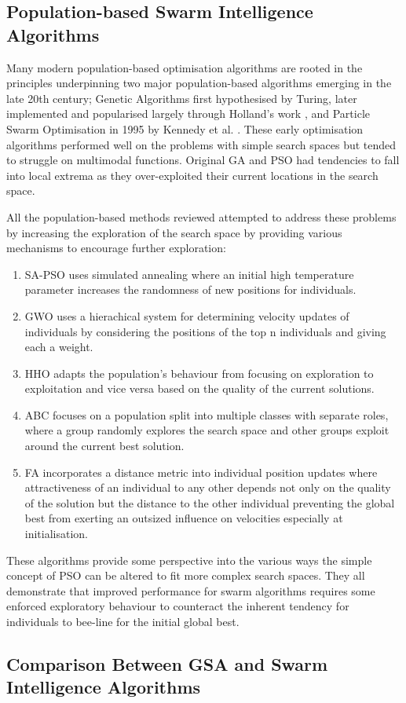 \documentclass[a4paper, 12pt]{extarticle}
\begin{document}
\subsection{Population-based Swarm Intelligence Algorithms}
Many modern population-based optimisation algorithms are rooted in the principles underpinning two major population-based algorithms emerging in the late 20th century; Genetic Algorithms first hypothesised by Turing, later implemented and popularised largely through Holland's work \cite{holland1992genetic}, and Particle Swarm Optimisation in 1995 by Kennedy et al. \cite{kennedy1995particle}. These early optimisation algorithms performed well on the problems with simple search spaces but tended to struggle on multimodal functions. Original GA and PSO had tendencies to fall into local extrema as they over-exploited their current locations in the search space.

All the population-based methods reviewed attempted to address these problems by increasing the exploration of the search space by providing various mechanisms to encourage further exploration:
\begin{enumerate}
    \item SA-PSO uses simulated annealing where an initial high temperature parameter increases the randomness of new positions for individuals.
    \item GWO uses a hierachical system for determining velocity updates of individuals by considering the positions of the top n individuals and giving each a weight.
    \item HHO adapts the population's behaviour from focusing on exploration to exploitation and vice versa based on the quality of the current solutions.
    \item ABC focuses on a population split into multiple classes with separate roles, where a group randomly explores the search space and other groups exploit around the current best solution.
    \item FA incorporates a distance metric into individual position updates where attractiveness of an individual to any other depends not only on the quality of the solution but the distance to the other individual preventing the global best from exerting an outsized influence on velocities especially at initialisation.
\end{enumerate}

These algorithms provide some perspective into the various ways the simple concept of PSO can be altered to fit more complex search spaces. They all demonstrate that improved performance for swarm algorithms requires some enforced exploratory behaviour to counteract the inherent tendency for individuals to bee-line for the initial global best. 


\subsection{Comparison Between GSA and Swarm Intelligence Algorithms}




\newpage

\printbibliography
\end{document}
